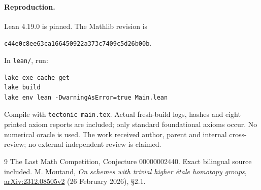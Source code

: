 \documentclass[11pt]{article}
\begin{document}
\paragraph{Reproduction.}
Lean 4.19.0 is pinned. The Mathlib revision is
\begin{center}
\texttt{c44e0c8ee63ca166450922a373c7409c5d26b00b}.
\end{center}
In \texttt{lean/}, run:
\begin{verbatim}
lake exe cache get
lake build
lake env lean -DwarningAsError=true Main.lean
\end{verbatim}
Compile with \texttt{tectonic main.tex}. Actual fresh-build
logs, hashes and eight printed axiom reports are included;
only standard foundational axioms occur. No numerical oracle is
used. The work received author, parent and internal cross-review;
no external independent review is claimed.

\begin{thebibliography}{9}
 The Last Math Competition,
Conjecture 00000002440. Exact bilingual source included.
 M. Moutand,
\emph{On schemes with trivial higher \'etale homotopy groups},
\href{https://arxiv.org/abs/2312.08505}{arXiv:2312.08505v2}
(26 February 2026), \S2.1.
\end{thebibliography}
\end{document}
